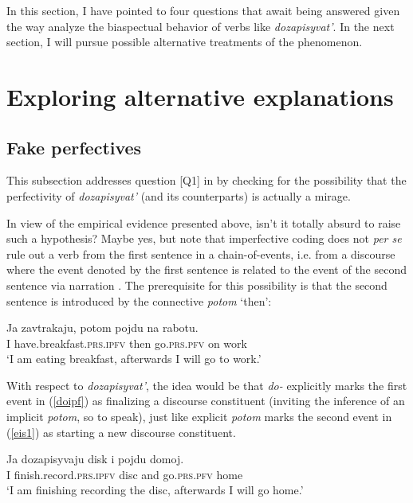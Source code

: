 \documentclass[output=paper,
colorlinks,
citecolor=brown,
newtxmath
]{langscibook}
\begin{document}
\noindent In this section, I have pointed to four questions that await being answered given the way \citet{Zinova.Filip2015} analyze the biaspectual behavior of verbs like \textit{dozapisyvat'}.
In the next section, I will pursue possible alternative treatments of the phenomenon.


\section{Exploring alternative explanations}\label{sec4}

\subsection{Fake perfectives}\label{H2}

This subsection addresses question [Q1] in  by checking for the possibility that the perfectivity of \textit{dozapisyvat'} (and its counterparts) is actually a mirage.

In view of the empirical evidence presented above, isn't it totally absurd to raise such a hypothesis? Maybe yes, but note that imperfective coding does not \textit{per se} rule out a verb from the first sentence in a chain-of-events, i.e. from a discourse where the event denoted by the first sentence is related to the event of the second sentence via narration \citep[31]{Zinova2016}. The prerequisite for this possibility is that the second sentence is introduced by the connective \textit{potom} `then':

\ea\label{eis1}
\gll Ja zavtrakaju, potom pojdu na rabotu.\\
I {have.breakfast.}\textsc{prs.ipfv} then go.\textsc{prs.pfv} on work\\
\glt `I am eating breakfast, afterwards I will go to work.'
\z

\noindent With respect to \textit{dozapisyvat'}, the idea would be that \textit{do-}
explicitly marks the first event in (\ref{doipf}) as finalizing a discourse constituent (inviting the inference of an implicit \textit{potom}, so to speak), just like explicit \textit{potom} marks the second event in (\ref{eis1}) as starting a new discourse constituent.

\ea\label{doipf}
\gll Ja dozapisyvaju disk i pojdu domoj.\\
I {finish.record.}\textsc{prs.ipfv} disc and go.\textsc{prs.pfv} home\\
\glt`I am finishing recording the disc, afterwards I will go home.'
\z
\end{document}
